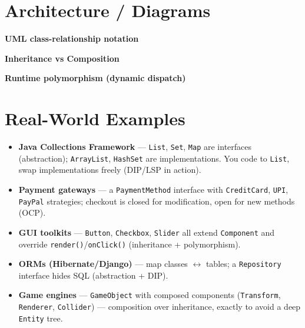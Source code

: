 \documentclass[11pt]{article}
\providecommand{\tightlist}{\setlength{\itemsep}{1pt}\setlength{\parskip}{0pt}}
\begin{document}
\section{Architecture / Diagrams}\label{architecture--diagrams}

\textbf{UML class-relationship notation}


\textbf{Inheritance vs Composition}


\textbf{Runtime polymorphism (dynamic dispatch)}


\section{Real-World Examples}\label{real-world-examples}

\begin{itemize}
\tightlist
\item
  \textbf{Java Collections Framework} --- \texttt{List}, \texttt{Set}, \texttt{Map} are interfaces (abstraction); \texttt{ArrayList}, \texttt{HashSet} are implementations. You code to \texttt{List}, swap implementations freely (DIP/LSP in action).
\item
  \textbf{Payment gateways} --- a \texttt{PaymentMethod} interface with \texttt{CreditCard}, \texttt{UPI}, \texttt{PayPal} strategies; checkout is closed for modification, open for new methods (OCP).
\item
  \textbf{GUI toolkits} --- \texttt{Button}, \texttt{Checkbox}, \texttt{Slider} all extend \texttt{Component} and override \texttt{render()}/\texttt{onClick()} (inheritance + polymorphism).
\item
  \textbf{ORMs (Hibernate/Django)} --- map classes \(\leftrightarrow\) tables; a \texttt{Repository} interface hides SQL (abstraction + DIP).
\item
  \textbf{Game engines} --- \texttt{GameObject} with composed components (\texttt{Transform}, \texttt{Renderer}, \texttt{Collider}) --- composition over inheritance, exactly to avoid a deep \texttt{Entity} tree.
\end{itemize}
\end{document}
